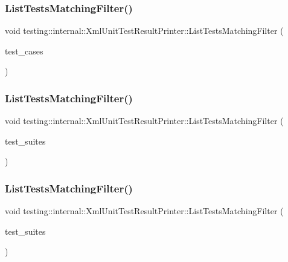 \subsubsection{\texorpdfstring{ListTestsMatchingFilter()}{ListTestsMatchingFilter()}\hspace{0.1cm}{\footnotesize\ttfamily [1/3]}}
{\footnotesize\ttfamily void testing\+::internal\+::\+Xml\+Unit\+Test\+Result\+Printer\+::\+List\+Tests\+Matching\+Filter (\begin{DoxyParamCaption}\item[{const std\+::vector$<$ \mbox{\hyperlink{classtesting_1_1_test_case}{Test\+Case}} $\ast$ $>$ \&}]{test\+\_\+cases }\end{DoxyParamCaption})}

\mbox{\label{classtesting_1_1internal_1_1_xml_unit_test_result_printer_a5bbda9739d45a9e01190b2663dcbc5ac}} 
\subsubsection{\texorpdfstring{ListTestsMatchingFilter()}{ListTestsMatchingFilter()}\hspace{0.1cm}{\footnotesize\ttfamily [2/3]}}
{\footnotesize\ttfamily void testing\+::internal\+::\+Xml\+Unit\+Test\+Result\+Printer\+::\+List\+Tests\+Matching\+Filter (\begin{DoxyParamCaption}\item[{const std\+::vector$<$ \mbox{\hyperlink{classtesting_1_1_test_suite}{Test\+Suite}} $\ast$ $>$ \&}]{test\+\_\+suites }\end{DoxyParamCaption})}

\mbox{\label{classtesting_1_1internal_1_1_xml_unit_test_result_printer_a5bbda9739d45a9e01190b2663dcbc5ac}} 
\subsubsection{\texorpdfstring{ListTestsMatchingFilter()}{ListTestsMatchingFilter()}\hspace{0.1cm}{\footnotesize\ttfamily [3/3]}}
{\footnotesize\ttfamily void testing\+::internal\+::\+Xml\+Unit\+Test\+Result\+Printer\+::\+List\+Tests\+Matching\+Filter (\begin{DoxyParamCaption}\item[{const std\+::vector$<$ \mbox{\hyperlink{classtesting_1_1_test_suite}{Test\+Suite}} $\ast$ $>$ \&}]{test\+\_\+suites }\end{DoxyParamCaption})}

